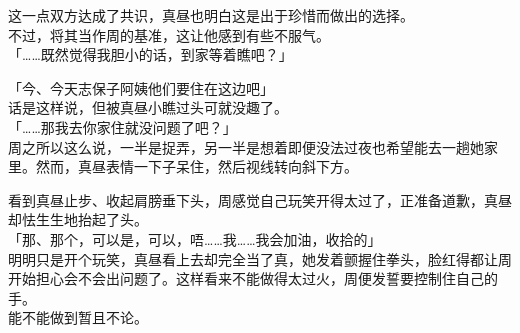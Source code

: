 这一点双方达成了共识，真昼也明白这是出于珍惜而做出的选择。\\

不过，将其当作周的基准，这让他感到有些不服气。\\

「……既然觉得我胆小的话，到家等着瞧吧？」

「今、今天志保子阿姨他们要住在这边吧」\\

话是这样说，但被真昼小瞧过头可就没趣了。\\

「……那我去你家住就没问题了吧？」\\

周之所以这么说，一半是捉弄，另一半是想着即便没法过夜也希望能去一趟她家里。然而，真昼表情一下子呆住，然后视线转向斜下方。

看到真昼止步、收起肩膀垂下头，周感觉自己玩笑开得太过了，正准备道歉，真昼却怯生生地抬起了头。\\

「那、那个，可以是，可以，唔……我……我会加油，收拾的」\\

明明只是开个玩笑，真昼看上去却完全当了真，她发着颤握住拳头，脸红得都让周开始担心会不会出问题了。这样看来不能做得太过火，周便发誓要控制住自己的手。\\

能不能做到暂且不论。

